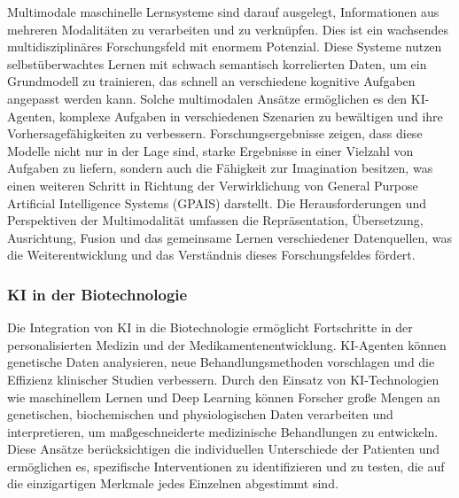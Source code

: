 \documentclass[conference]{IEEEtran}
\begin{document}
Multimodale maschinelle Lernsysteme sind darauf ausgelegt, Informationen aus mehreren Modalitäten zu verarbeiten und zu verknüpfen\cite{triguero_general_2024}. Dies ist ein wachsendes multidisziplinäres Forschungsfeld mit enormem Potenzial. Diese Systeme nutzen selbstüberwachtes Lernen mit schwach semantisch korrelierten Daten, um ein Grundmodell zu trainieren, das schnell an verschiedene kognitive Aufgaben angepasst werden kann. Solche multimodalen Ansätze ermöglichen es den KI-Agenten, komplexe Aufgaben in verschiedenen Szenarien zu bewältigen und ihre Vorhersagefähigkeiten zu verbessern. Forschungsergebnisse zeigen, dass diese Modelle nicht nur in der Lage sind, starke Ergebnisse in einer Vielzahl von Aufgaben zu liefern, sondern auch die Fähigkeit zur Imagination besitzen, was einen weiteren Schritt in Richtung der Verwirklichung von General Purpose Artificial Intelligence Systems (GPAIS) darstellt. Die Herausforderungen und Perspektiven der Multimodalität umfassen die Repräsentation, Übersetzung, Ausrichtung, Fusion und das gemeinsame Lernen verschiedener Datenquellen, was die Weiterentwicklung und das Verständnis dieses Forschungsfeldes fördert\cite{baltrusaitis_multimodal_2019}.

\subsubsection{KI in der Biotechnologie}

Die Integration von KI in die Biotechnologie ermöglicht Fortschritte in der personalisierten Medizin und der Medikamentenentwicklung\cite{schork_artificial_2019}. KI-Agenten können genetische Daten analysieren, neue Behandlungsmethoden vorschlagen und die Effizienz klinischer Studien verbessern. Durch den Einsatz von KI-Technologien wie maschinellem Lernen und Deep Learning können Forscher große Mengen an genetischen, biochemischen und physiologischen Daten verarbeiten und interpretieren, um maßgeschneiderte medizinische Behandlungen zu entwickeln. Diese Ansätze berücksichtigen die individuellen Unterschiede der Patienten und ermöglichen es, spezifische Interventionen zu identifizieren und zu testen, die auf die einzigartigen Merkmale jedes Einzelnen abgestimmt sind.
\end{document}
